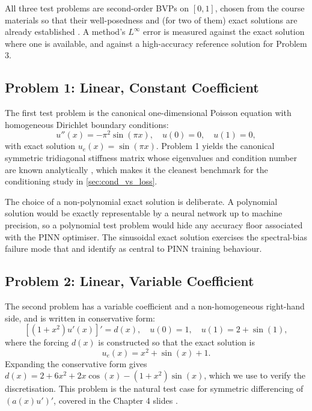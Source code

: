 \documentclass[11pt]{article}
\theoremstyle{plain}
\theoremstyle{remark}
\newcommand{\Linf}{L^\infty}
\begin{document}
All three test problems are second-order BVPs on $[0,1]$, chosen from the
course materials so that their well-posedness and (for two of them) exact
solutions are already established \citep{khouider2026bvp,khouider2026notes}.
A method's $\Linf$ error is measured against the exact solution where one is
available, and against a high-accuracy reference solution for Problem 3.


\subsection{Problem 1: Linear, Constant Coefficient}
\label{sec:prob1}

The first test problem is the canonical one-dimensional Poisson equation
with homogeneous Dirichlet boundary conditions:
\begin{equation}
u''(x) = -\pi^2 \sin(\pi x), \quad u(0) = 0, \quad u(1) = 0,
\label{eq:prob1}
\end{equation}
with exact solution $u_e(x) = \sin(\pi x)$. Problem 1 yields the canonical
symmetric tridiagonal stiffness matrix whose eigenvalues and condition number
are known analytically \citep[\S5.4]{khouider2026notes}, which makes it the
cleanest benchmark for the conditioning study in \cref{sec:cond_vs_loss}.

The choice of a non-polynomial exact solution is deliberate. A polynomial
solution would be exactly representable by a neural network up to machine
precision, so a polynomial test problem would hide any accuracy floor
associated with the PINN optimiser. The sinusoidal exact solution exercises
the spectral-bias failure mode that \citet{rahaman2019} and
\citet{wang2021eigenvector} identify as central to PINN training behaviour.


\subsection{Problem 2: Linear, Variable Coefficient}
\label{sec:prob2}

The second problem has a variable coefficient and a non-homogeneous
right-hand side, and is written in conservative form:
\begin{equation}
\left[ (1 + x^2) u'(x) \right]' = d(x), \quad u(0) = 1, \quad u(1) = 2 + \sin(1),
\label{eq:prob2}
\end{equation}
where the forcing $d(x)$ is constructed so that the exact solution is
\begin{equation*}
u_e(x) = x^2 + \sin(x) + 1.
\end{equation*}
Expanding the conservative form gives
$d(x) = 2 + 6x^2 + 2x\cos(x) - (1+x^2)\sin(x)$, which we use to verify the
discretisation. This problem is the natural test case for symmetric
differencing of $(a(x)u')'$, covered in the Chapter 4 slides
\citep{khouider2026bvp}.
\end{document}
